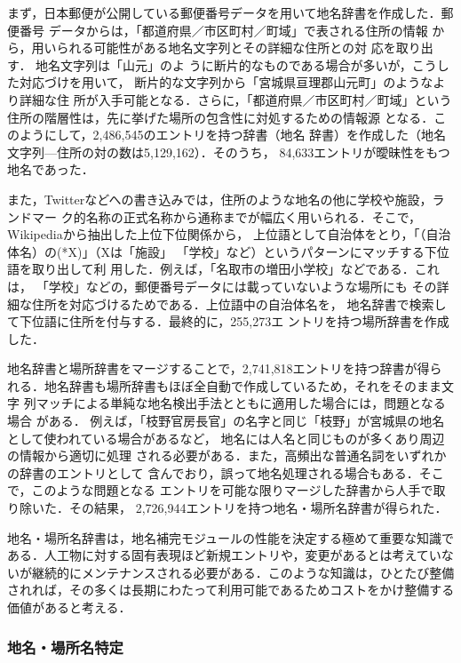 \documentclass[japanese]{jnlp_1.4}
\begin{document}
まず，日本郵便が公開している郵便番号データを用いて地名辞書を作成した．郵便番号
データからは，「都道府県／市区町村／町域」で表される住所の情報
から，用いられる可能性がある地名文字列とその詳細な住所との対
応を取り出す． 
地名文字列は「山元」のよ
うに断片的なものである場合が多いが，こうした対応づけを用いて，
断片的な文字列から「宮城県亘理郡山元町」のようなより詳細な住
所が入手可能となる．さらに，「都道府県／市区町村／町域」という
住所の階層性は，先に挙げた場所の包含性に対処するための情報源
となる．このようにして，2,486,545のエントリを持つ辞書（地名
辞書）を作成した（地名文字列—住所の対の数は5,129,162）．そのうち，
84,633エントリが曖昧性をもつ地名であった． 

また，Twitterなどへの書き込みでは，住所のような地名の他に学校や施設，ランドマー
ク的名称の正式名称から通称までが幅広く用いられる．そこで，Wikipediaから抽出した上位下位関係\cite{Yamada2009}から，
上位語として自治体をとり，「（自治体名）の(*X)」（Xは「施設」
「学校」など）というパターンにマッチする下位語を取り出して利
用した．例えば，「名取市の増田小学校」などである．これは，
「学校」などの，郵便番号データには載っていないような場所にも
その詳細な住所を対応づけるためである．上位語中の自治体名を，
地名辞書で検索して下位語に住所を付与する．最終的に，255,273エ
ントリを持つ場所辞書を作成した． 

地名辞書と場所辞書をマージすることで，2,741,818エントリを持つ辞書が得ら
れる．地名辞書も場所辞書もほぼ全自動で作成しているため，それをそのまま文字
列マッチによる単純な地名検出手法とともに適用した場合には，問題となる場合
がある．
例えば，「枝野官房長官」の名字と同じ「枝野」が宮城県の地名として使われている場合があるなど，
地名には人名と同じものが多くあり周辺の情報から適切に処理
される必要がある．また，高頻出な普通名詞をいずれかの辞書のエントリとして
含んでおり，誤って地名処理される場合もある．そこで，このような問題となる
エントリを可能な限りマージした辞書から人手で取り除いた．その結果，
2,726,944エントリを持つ地名・場所名辞書が得られた．

地名・場所名辞書は，地名補完モジュールの性能を決定する極めて重要な知識で
ある．人工物に対する固有表現ほど新規エントリや，変更があるとは考えていな
いが継続的にメンテナンスされる必要がある．このような知識は，ひとたび整備
されれば，その多くは長期にわたって利用可能であるためコストをかけ整備する
価値があると考える．


\subsubsection{地名・場所名特定}
\end{document}
